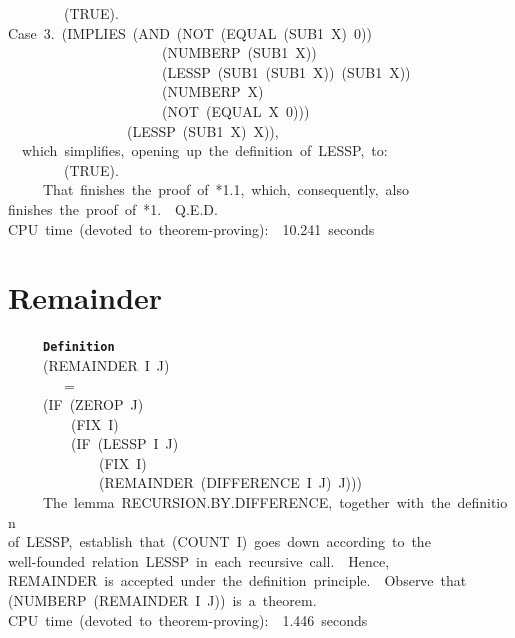 \documentclass[11pt]{book}
\newenvironment{pubasis}{\begin{flushleft}\ttfamily\small}{\normalsize\rmfamily\end{flushleft}}
\newcommand{\axiomordefinition}[1]{\vspace{6pt}\texttt{\textbf{#1}}}
\newcommand{\pubdefaulttextsize}{\large}
\begin{document}
\begin{pubasis}
~~~~~~~~(TRUE).\\

Case~3.~(IMPLIES~(AND~(NOT~(EQUAL~(SUB1~X)~0))\\
~~~~~~~~~~~~~~~~~~~~~~(NUMBERP~(SUB1~X))\\
~~~~~~~~~~~~~~~~~~~~~~(LESSP~(SUB1~(SUB1~X))~(SUB1~X))\\
~~~~~~~~~~~~~~~~~~~~~~(NUMBERP~X)\\
~~~~~~~~~~~~~~~~~~~~~~(NOT~(EQUAL~X~0)))\\
~~~~~~~~~~~~~~~~~(LESSP~(SUB1~X)~X)),\\

~~which~simplifies,~opening~up~the~definition~of~LESSP,~to:\\

~~~~~~~~(TRUE).\\

~~~~~That~finishes~the~proof~of~*1.1,~which,~consequently,~also\\
finishes~the~proof~of~*1.~~Q.E.D.\\

CPU~time~(devoted~to~theorem-proving):~~10.241~seconds\\
\end{pubasis}
\section{Remainder}
\pubdefaulttextsize
\begin{pubasis}
~~~~~\axiomordefinition{Definition}\\
~~~~~(REMAINDER~I~J)\\
~~~~~~~~=\\
~~~~~(IF~(ZEROP~J)\\
~~~~~~~~~(FIX~I)\\
~~~~~~~~~(IF~(LESSP~I~J)\\
~~~~~~~~~~~~~(FIX~I)\\
~~~~~~~~~~~~~(REMAINDER~(DIFFERENCE~I~J)~J)))\\

~~~~~The~lemma~RECURSION.BY.DIF\-FER\-ENCE,~together~with~the~definition\\
of~LESSP,~establish~that~(COUNT~I)~goes~down~according~to~the\\
well-founded~relation~LESSP~in~each~recursive~call.~~Hence,\\
REMAINDER~is~accepted~under~the~definition~principle.~~Observe~that\\
(NUMBERP~(REMAINDER~I~J))~is~a~theorem.\\

CPU~time~(devoted~to~theorem-proving):~~1.446~seconds\\
\end{pubasis}
\end{document}
